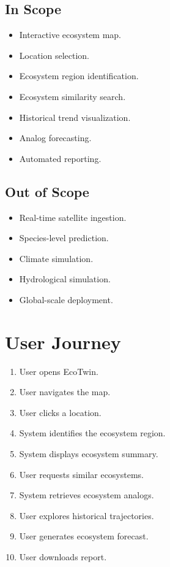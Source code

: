 \documentclass[11pt,a4paper]{article}
\begin{document}
\subsection{In Scope}

\begin{itemize}
\item Interactive ecosystem map.
\item Location selection.
\item Ecosystem region identification.
\item Ecosystem similarity search.
\item Historical trend visualization.
\item Analog forecasting.
\item Automated reporting.
\end{itemize}

\subsection{Out of Scope}

\begin{itemize}
\item Real-time satellite ingestion.
\item Species-level prediction.
\item Climate simulation.
\item Hydrological simulation.
\item Global-scale deployment.
\end{itemize}

\section{User Journey}

\begin{enumerate}
\item User opens EcoTwin.
\item User navigates the map.
\item User clicks a location.
\item System identifies the ecosystem region.
\item System displays ecosystem summary.
\item User requests similar ecosystems.
\item System retrieves ecosystem analogs.
\item User explores historical trajectories.
\item User generates ecosystem forecast.
\item User downloads report.
\end{enumerate}
\end{document}
